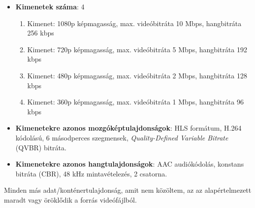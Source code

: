 \begin{itemize}
  \setlength{\itemsep}{1pt}
  \setlength{\parskip}{0pt}
  \setlength{\parsep}{0pt}
  \item \textbf{Kimenetek száma}: 4
        \begin{enumerate}
          \setlength{\itemsep}{1pt}
          \setlength{\parskip}{0pt}
          \setlength{\parsep}{0pt}
          \item Kimenet: 1080p képmagasság, max. videóbitráta 10 Mbps, hangbitráta 256 kbps
          \item Kimenet: 720p képmagasság, max. videóbitráta 5 Mbps, hangbitráta 192 kbps
          \item Kimenet: 480p képmagasság, max. videóbitráta 2 Mbps, hangbitráta 128 kbps
          \item Kimenet: 360p képmagasság, max. videóbitráta 1 Mbps, hangbitráta 96 kbps
        \end{enumerate}
  \item \textbf{Kimenetekre azonos mozgóképtulajdonságok}: HLS formátum, H.264 kódolású, 6 másodperces szegmensek, \emph{Quality-Defined Variable Bitrate} (QVBR) bitráta\cite{qvbr}.
  \item \textbf{Kimenetekre azonos hangtulajdonságok}: AAC audiókódolás, konstans bitráta (CBR), 48 kHz mintavételezés, 2 csatorna.
\end{itemize}

Minden más adat/konténertulajdonság, amit nem közöltem, az az alapértelmezett maradt vagy öröklődik a forrás videófájlból.

